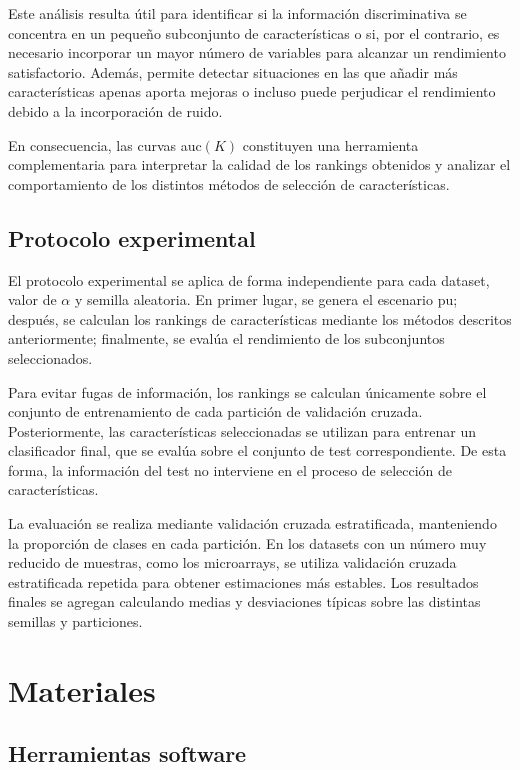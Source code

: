 Este análisis resulta útil para identificar si la información discriminativa se concentra en un pequeño subconjunto de características o si, por el contrario, es necesario incorporar un mayor número de variables para alcanzar un rendimiento satisfactorio. Además, permite detectar situaciones en las que añadir más características apenas aporta mejoras o incluso puede perjudicar el rendimiento debido a la incorporación de ruido.

En consecuencia, las curvas \acrshort{auc}$(K)$ constituyen una herramienta complementaria para interpretar la calidad de los rankings obtenidos y analizar el comportamiento de los distintos métodos de selección de características.

\section{Protocolo experimental}
\label{sec:protocolo_experimental}

El protocolo experimental se aplica de forma independiente para cada dataset, valor de $\alpha$ y semilla aleatoria. En primer lugar, se genera el escenario \acrshort{pu}; después, se calculan los rankings de características mediante los métodos descritos anteriormente; finalmente, se evalúa el rendimiento de los subconjuntos seleccionados.

Para evitar fugas de información, los rankings se calculan únicamente sobre el conjunto de entrenamiento de cada partición de validación cruzada. Posteriormente, las características seleccionadas se utilizan para entrenar un clasificador final, que se evalúa sobre el conjunto de test correspondiente. De esta forma, la información del test no interviene en el proceso de selección de características.

La evaluación se realiza mediante validación cruzada estratificada, manteniendo la proporción de clases en cada partición. En los datasets con un número muy reducido de muestras, como los microarrays, se utiliza validación cruzada estratificada repetida para obtener estimaciones más estables. Los resultados finales se agregan calculando medias y desviaciones típicas sobre las distintas semillas y particiones.

\chapter{Materiales}
\section{Herramientas software}
\label{sec:software}

